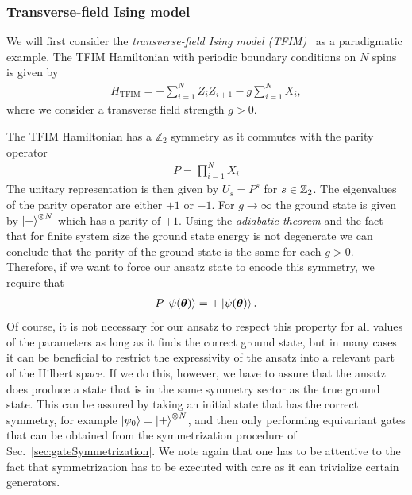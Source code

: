\documentclass[a4paper,twocolumn,notitlepage,nofootinbib,superscriptaddress,floatfix]{revtex4-2}
\begin{document}
\subsubsection*{Transverse-field Ising model}
We will first consider the \emph{transverse-field Ising model (TFIM)}~\cite{Franchini_2017} as a paradigmatic example. The TFIM Hamiltonian with periodic boundary conditions on $N$ spins is given by
\begin{align}
    {H}_{\text{TFIM}}=-\sum_{i=1}^{N}Z_i Z_{i+1} - g\sum_{i=1}^{N}X_i,
\end{align}
where we consider a transverse field strength $g>0$.

The TFIM Hamiltonian has a $\mathbb{Z}_2$ symmetry as it commutes with the parity operator
\begin{align}
    P = \prod_{i=1}^N X_i
\end{align}
The unitary representation is then given by $U_s = P^s$ for $s \in \mathbb{Z}_2$. The eigenvalues of the parity operator are either $+1$ or $-1$. For $g \rightarrow \infty$ the ground state is given by $\ket{+}^{\otimes N}$ which has a parity of $+1$. 
Using the \emph{adiabatic theorem} and the fact that for finite system size the ground state energy is not degenerate we can conclude that the parity of the ground state is the same for each $g>0$. Therefore, if we want to force our ansatz state to encode this symmetry, we require that
\begin{align}
    P \ket{\psi({\boldsymbol{\theta}})}= + \ket{\psi({\boldsymbol{\theta}})}.
\end{align}
Of course, it is not necessary for our ansatz to respect this property for all values of the parameters as long as it finds the correct ground state, but in many cases it can be beneficial to restrict the expressivity of the ansatz into a relevant part of the Hilbert space. If we do this, however, we have to assure that the ansatz does produce a state that is in the same symmetry sector as the true ground state. This can be assured by taking an initial state that has the correct symmetry, for example $\ket{\psi_0}=\ket{+}^{\otimes N}$, and then only performing equivariant gates that can be obtained from the symmetrization procedure of Sec.~\ref{sec:gateSymmetrization}. We note again that one has to be attentive to the fact that symmetrization has to be executed with care as it can trivialize certain generators.
\end{document}
